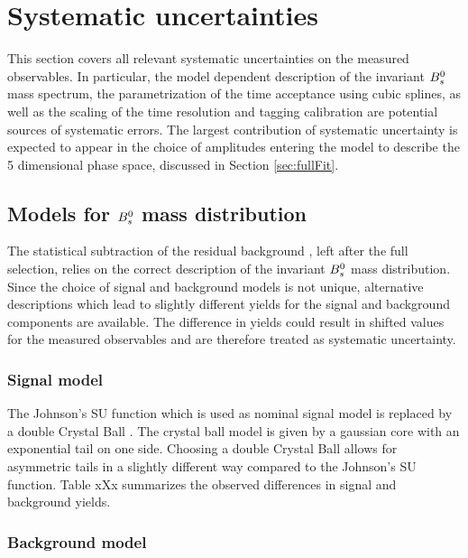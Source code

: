 \section{Systematic uncertainties}
\label{sec:Systematics}


This section covers all relevant systematic uncertainties on the measured observables.
In particular, the model dependent description of the invariant ${{B}^0_{s}}$ mass spectrum, the parametrization of the time acceptance using cubic splines, 
as well as the scaling of the time resolution and tagging calibration are potential sources of systematic errors. 
The largest contribution of systematic uncertainty is expected to appear in the choice of amplitudes entering the model to describe the 5 dimensional phase space, discussed in Section \ref{sec:fullFit}.

\subsection{Models for ${{B}^0_{s}}$ mass distribution}
\label{subsec:SystMass}

The statistical subtraction of the residual background \cite{Pivk:2004ty}, left after the full selection, relies on the correct description of the invariant ${{B}^0_{s}}$ mass distribution.
Since the choice of signal and background models is not unique, alternative descriptions which lead to slightly different yields for the signal and background components are available. 
The difference in yields could result in shifted values for the measured observables and are therefore treated as systematic uncertainty. \newline

\subsubsection{Signal model}

The Johnson's SU function which is used as nominal signal model is replaced by a double Crystal Ball \cite{CB}. 
The crystal ball model is given by a gaussian core with an exponential tail on one side. 
Choosing a double Crystal Ball allows for asymmetric tails in a slightly different way compared to the Johnson's SU function. 
Table xXx summarizes the observed differences in signal and background yields.

\subsubsection{Background model}


